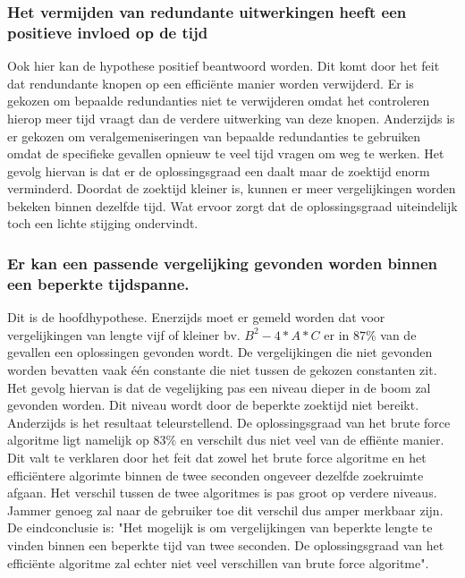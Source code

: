 \documentclass[Main.tex]{subfiles}
\begin{document}
\subsubsection{Het vermijden van redundante uitwerkingen heeft een positieve invloed op de tijd}
Ook hier kan de hypothese positief beantwoord worden. Dit komt door het feit dat rendundante knopen op een effici\"ente manier worden verwijderd. Er is gekozen om bepaalde redundanties niet te verwijderen omdat het controleren hierop meer tijd vraagt dan de verdere uitwerking van deze knopen. Anderzijds is er gekozen om veralgemeniseringen van bepaalde redundanties te gebruiken omdat de specifieke gevallen opnieuw te veel tijd vragen om weg te werken. Het gevolg hiervan is dat er de oplossingsgraad een daalt maar de zoektijd enorm verminderd. Doordat de zoektijd kleiner is, kunnen er meer vergelijkingen worden bekeken binnen dezelfde tijd. Wat ervoor zorgt dat de oplossingsgraad uiteindelijk toch een lichte stijging ondervindt.

\subsubsection{Er kan een passende vergelijking gevonden worden binnen een beperkte tijdspanne.}
Dit is de hoofdhypothese. Enerzijds moet er gemeld worden dat voor vergelijkingen van lengte vijf of kleiner bv. $B^{2} - 4 \ast A \ast C$ er in $87\%$ van de gevallen een oplossingen gevonden wordt. De vergelijkingen die niet gevonden worden bevatten vaak \'e\'en constante die niet tussen de gekozen constanten zit. Het gevolg hiervan is dat de vegelijking pas een niveau dieper in de boom zal gevonden worden. Dit niveau wordt door de beperkte zoektijd niet bereikt. Anderzijds is het resultaat teleurstellend. De oplossingsgraad van het brute force algoritme ligt namelijk op $83\%$ en verschilt dus niet veel van de effi\"ente manier. Dit valt te verklaren door het feit dat zowel het brute force algoritme en het effici\"entere algorimte binnen de twee seconden ongeveer dezelfde zoekruimte afgaan. Het verschil tussen de twee algoritmes is pas groot op verdere niveaus. Jammer genoeg zal naar de gebruiker toe dit verschil dus amper merkbaar zijn. De eindconclusie is: "Het mogelijk is om vergelijkingen van beperkte lengte te vinden binnen een beperkte tijd van twee seconden. De oplossingsgraad van het effici\"ente algoritme zal echter niet veel verschillen van brute force algoritme".
\end{document}
